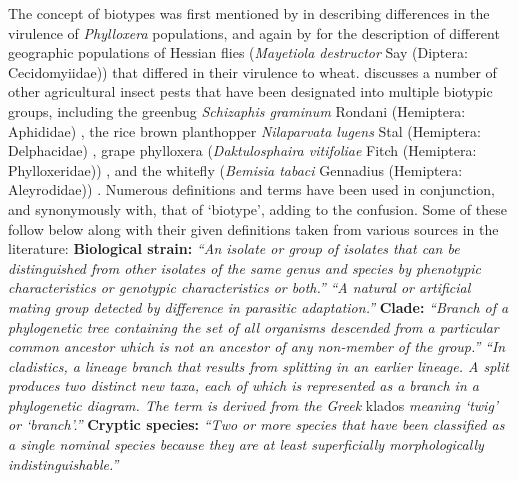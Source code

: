The concept of biotypes was first mentioned by \citet{printz1937contribution} in describing differences in the virulence of \textit{Phylloxera} populations, and again by \citet{painter1941economic} for the description of different geographic populations of Hessian flies (\textit{Mayetiola destructor} Say (Diptera: Cecidomyiidae)) that differed in their virulence to wheat.  \citet{Downie2010} discusses a number of other agricultural insect pests that have been designated into multiple biotypic groups, including the greenbug \textit{Schizaphis graminum} Rondani (Hemiptera: Aphididae) \citep{porter1997greenbug, burd2006biotypic}, the rice brown planthopper \textit{Nilaparvata lugens} Stal (Hemiptera: Delphacidae) \citep{naeemullah2009characterization}, grape phylloxera (\textit{Daktulosphaira vitifoliae} Fitch (Hemiptera: Phylloxeridae)) \citep{stevenson1970strains}, and the whitefly (\textit{Bemisia tabaci} Gennadius (Hemiptera: Aleyrodidae)) \citep{perring2001bemisia}. Numerous definitions and terms have been used in conjunction, and synonymously with, that of `biotype', adding to the confusion. Some of these follow below along with their given definitions taken from various sources in the literature: \newline \newline 
\textbf{Biological strain:} \textit{``An isolate or group of isolates that can be distinguished from other isolates of the same genus and species by phenotypic characteristics or genotypic characteristics or both.''} \citep{tenover1995interpreting} \newline 
\textit{``A natural or artificial mating group detected by difference in parasitic adaptation.''} \citep{darlington1950elements} \newline \newline
\textbf{Clade:} \textit{``Branch of a phylogenetic tree containing the set of all organisms descended from a particular common ancestor which is not an ancestor of any non-member of the group.''} \citep{hendersonDictionary} \newline
\textit{``In cladistics, a lineage branch that results from splitting in an earlier lineage. A split produces two distinct new taxa, each of which is represented as a branch in a phylogenetic diagram. The term is derived from the Greek} klados \textit{meaning `twig' or `branch'.''} \citep{allaby1992concise} \newline \newline 
\textbf{Cryptic species:} \textit{``Two or more species that have been classified as a single nominal species because they are at least superficially morphologically indistinguishable.''} \citep{bickford2007cryptic} \newline \newline 

